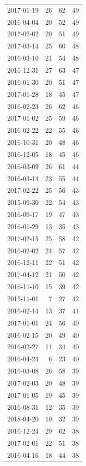 \begin{tabular}{lrrr}
2017-01-19 & 26 & 62 & 49 \\
2016-04-04 & 20 & 52 & 49 \\
2017-02-02 & 20 & 51 & 49 \\
2017-03-14 & 25 & 60 & 48 \\
2016-03-10 & 21 & 54 & 48 \\
2016-12-31 & 27 & 63 & 47 \\
2016-01-30 & 20 & 51 & 47 \\
2017-01-28 & 18 & 45 & 47 \\
2016-02-23 & 26 & 62 & 46 \\
2017-01-02 & 25 & 59 & 46 \\
2016-02-22 & 22 & 55 & 46 \\
2016-10-31 & 20 & 48 & 46 \\
2016-12-05 & 18 & 45 & 46 \\
2016-03-09 & 26 & 61 & 44 \\
2016-03-14 & 23 & 55 & 44 \\
2017-02-22 & 25 & 56 & 43 \\
2015-09-30 & 22 & 54 & 43 \\
2016-09-17 & 19 & 47 & 43 \\
2016-01-29 & 13 & 35 & 43 \\
2017-02-15 & 25 & 58 & 42 \\
2016-02-02 & 24 & 57 & 42 \\
2016-12-11 & 22 & 51 & 42 \\
2017-04-12 & 21 & 50 & 42 \\
2016-11-10 & 15 & 39 & 42 \\
2015-11-01 & 7 & 27 & 42 \\
2016-02-14 & 13 & 37 & 41 \\
2017-01-01 & 24 & 56 & 40 \\
2016-02-15 & 20 & 49 & 40 \\
2016-02-27 & 11 & 34 & 40 \\
2016-04-24 & 6 & 23 & 40 \\
2016-03-08 & 26 & 58 & 39 \\
2017-02-03 & 20 & 48 & 39 \\
2017-01-05 & 19 & 45 & 39 \\
2016-08-31 & 12 & 35 & 39 \\
2018-04-20 & 10 & 32 & 39 \\
2016-12-24 & 29 & 62 & 38 \\
2017-02-01 & 22 & 51 & 38 \\
2016-04-16 & 18 & 44 & 38 \\

\end{tabular}
